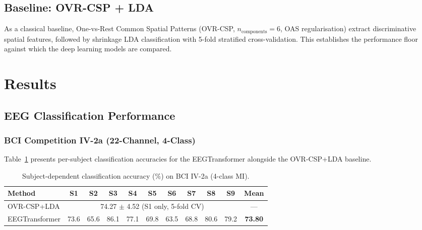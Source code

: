 \documentclass[12pt, a4paper]{article}
\begin{document}
\subsection{Baseline: OVR-CSP + LDA}

As a classical baseline, One-vs-Rest Common Spatial Patterns (OVR-CSP, $n_\text{components} = 6$, OAS regularisation) extract discriminative spatial features, followed by shrinkage LDA classification with 5-fold stratified cross-validation. This establishes the performance floor against which the deep learning models are compared.

\section{Results}

\subsection{EEG Classification Performance}

\subsubsection{BCI Competition IV-2a (22-Channel, 4-Class)}

Table~\ref{tab:iv2a_results} presents per-subject classification accuracies for the EEGTransformer alongside the OVR-CSP+LDA baseline.

\begin{table}[htbp]
\centering
\caption{Subject-dependent classification accuracy (\%) on BCI IV-2a (4-class MI).}
\label{tab:iv2a_results}
\begin{tabular}{lcccccccccc}
\toprule
\textbf{Method} & \textbf{S1} & \textbf{S2} & \textbf{S3} & \textbf{S4} & \textbf{S5} & \textbf{S6} & \textbf{S7} & \textbf{S8} & \textbf{S9} & \textbf{Mean} \\
\midrule
OVR-CSP+LDA & \multicolumn{9}{c}{74.27 $\pm$ 4.52 (S1 only, 5-fold CV)} & --- \\
EEGTransformer & 73.6 & 65.6 & 86.1 & 77.1 & 69.8 & 63.5 & 68.8 & 80.6 & 79.2 & \textbf{73.80} \\
\bottomrule
\end{tabular}
\end{table}
\end{document}
